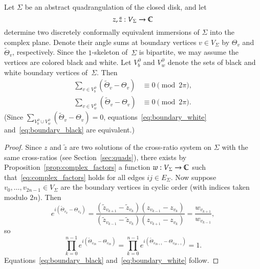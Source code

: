 \documentclass[Thesis]{subfiles}
\begin{document}
\begin{theorem}
  Let $\Sigma$ be an abstract quadrangulation of the closed disk, and
  let 
  \begin{equation*}
    z,\tilde z: V_{\Sigma}\rightarrow\mathbb C
  \end{equation*}
  determine two discretely conformally equivalent immersions of\/
  $\Sigma$ into the complex plane. Denote their angle sums at boundary
  vertices $v\in V_{\Sigma}$ by\/ $\Theta_{v}$ and\/
  $\tilde\Theta_{v}$, respectively. Since the $1$-skeleton of\/~$\Sigma$ is
  bipartite, we may assume the vertices are colored black and
  white. Let $V^{\partial}_{b}$ and $V^{\partial}_{w}$ denote the sets
  of black and white boundary vertices of\/~$\Sigma$. Then
  \begin{align}
    \label{eq:boundary_black}
    \sum_{v\in V^{\partial}_b}(\tilde\Theta_v - \Theta_v)
    &\equiv 0 \pmod{2\pi},\\
    \label{eq:boundary_white}
    \sum_{v\in V^{\partial}_w}(\tilde\Theta_v - \Theta_v)
    &\equiv 0 \pmod{2\pi}.
  \end{align}
  (Since $\sum_{V^{\partial}_b \cup
    V^{\partial}_w}(\tilde\Theta_{v}-\Theta_{v})=0$,
  equations~\eqref{eq:boundary_white} and~\eqref{eq:boundary_black}
  are equivalent.)
\end{theorem}

\begin{proof}
  Since $z$ and $\tilde z$ are two solutions of the cross-ratio system
  on $\Sigma$ with the same cross-ratios (see
  Section~\ref{sec:quads}), there exists by
  Proposition~\ref{prop:complex_factors} a function
  $w:V_{\Sigma}\rightarrow\mathbb C$ such that~\eqref{eq:complex_factors}
  holds for all edges $\mathit{ij}\in E_{\Sigma}$. Now suppose
  $v_{0},\ldots,v_{2n-1}\in V_{\Sigma}$ are the boundary vertices in
  cyclic order (with indices taken modulo $2n$). Then
  \begin{equation*}
    e^{i(\tilde\Theta_{v_{k}} - \Theta_{v_{k}})}=
    \frac{(\tilde z_{v_{k+1}}-\tilde z_{v_{k}})(z_{v_{k-1}}-z_{v_{k}})}%
    {(\tilde z_{v_{k-1}}-\tilde z_{v_{k}})(z_{v_{k+1}}-z_{v_{k}})}
    =\frac{w_{v_{k+1}}}{w_{v_{k-1}}},
  \end{equation*}
  so
  \begin{equation*}
    \prod_{k=0}^{n-1}e^{i(\tilde\Theta_{v_{2k}} - \Theta_{v_{2k}})}=
    \prod_{k=0}^{n-1}e^{i(\tilde\Theta_{v_{2k+1}} -
      \Theta_{v_{2k+1}})}=
    1.
  \end{equation*}
  Equations~\eqref{eq:boundary_black} and~\eqref{eq:boundary_white}
  follow.
\end{proof}
\end{document}
